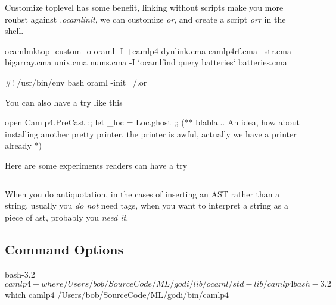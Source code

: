 Customize toplevel has some benefit, linking without scripts make you
more roubst against \textit{.ocamlinit}, we can customize \textit{or}, and
create a script \textit{orr} in the shell.

\begin{ocamlcode}
  ocamlmktop -custom -o oraml -I +camlp4 dynlink.cma camlp4rf.cma \
  str.cma bigarray.cma unix.cma nums.cma -I `ocamlfind query
  batteries` batteries.cma
\end{ocamlcode}

\begin{bashcode}
#! /usr/bin/env bash
oraml -init ~/.or  
\end{bashcode}

You can also have a try like this
\begin{ocamlcode}
open Camlp4.PreCast ;;
let _loc = Loc.ghost ;;
(** 
   blabla...
   An idea, how about installing another pretty printer,
   the printer is awful, actually we have a printer already *)
\end{ocamlcode}

Here are some experiments readers can have a try

\inputminted[fontsize=\scriptsize,bgcolor=lightlightgray]{ocaml}{code/camlp4/experiment/part2.ml}
\captionof{listing}{Play with camlp4 AST \label{Play With Camlp4 AST }}

When you do antiquotation, in the cases of inserting an AST rather
than a string, usually you \textit{do not} need tags, when you
want to interpret a string as a piece of ast, probably you \textit{need it.}
  
\subsection{Command Options}

\begin{bashcode}
bash-3.2$ camlp4 -where
/Users/bob/SourceCode/ML/godi/lib/ocaml/std-lib/camlp4
bash-3.2$ which camlp4
/Users/bob/SourceCode/ML/godi/bin/camlp4
\end{bashcode}


